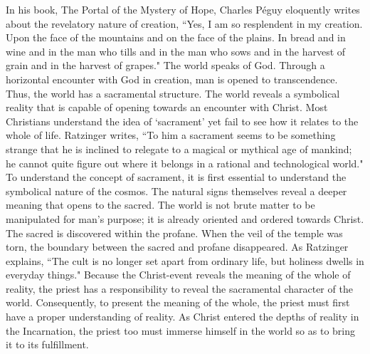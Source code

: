 \documentclass[twoside,10pt]{article}
\begin{document}
In his book, The Portal of the Mystery of Hope, Charles Péguy eloquently writes about the revelatory nature of creation, ``Yes, I am so resplendent in my creation. Upon the face of the mountains and on the face of the plains. In bread and in wine and in the man who tills and in the man who sows and in the harvest of grain and in the harvest of grapes."\autocite[4]{peguy} The world speaks of God. Through a horizontal encounter with God in creation, man is opened to transcendence. Thus, the world has a sacramental structure. The world reveals a symbolical reality that is capable of opening towards an encounter with Christ. Most Christians understand the idea of ‘sacrament’ yet fail to see how it relates to the whole of life. Ratzinger writes, ``To him a sacrament seems to be something strange that he is inclined to relegate to a magical or mythical age of mankind; he cannot quite figure out where it belongs in a rational and technological world."\autocite[169]{rat2} To understand the concept of sacrament, it is first essential to understand the symbolical nature of the cosmos. The natural signs themselves reveal a deeper meaning that opens to the sacred. The world is not brute matter to be manipulated for man’s purpose; it is already oriented and ordered towards Christ. The sacred is discovered within the profane. When the veil of the temple was torn, the boundary between the sacred and profane disappeared. As Ratzinger explains, ``The cult is no longer set apart from ordinary life, but holiness dwells in everyday things."\autocite[400]{rat2} Because the Christ-event reveals the meaning of the whole of reality, the priest has a responsibility to reveal the sacramental character of the world. Consequently, to present the meaning of the whole, the priest must first have a proper understanding of reality.\autocite[Cf.][Ratzinger links the crisis in the priesthood and the lack of vocations to a loss of understanding of reality. In modernity, the sacred is replaced by the functional and the world is seen simply as brute matter. This conception of the world alters the meaning of life. In order to understand the identity and mission of the priest, it is first essential to recover a more adequate understanding of the order and nature of the world so as to be able to recognize the priest’s role within that order.]{rat3} As Christ entered the depths of reality in the Incarnation, the priest too must immerse himself in the world so as to bring it to its fulfillment.\autocite[Cf.][John Chrysostom exemplifies this in his Baptismal Instructions. In order to explain the reality taking place, he draws analogies to real-world examples. In his Ninth Baptismal Instruction, he likens the renewal of nature in Baptism to a gold statue covered in dirt that must be melted down in order to be purified. He says that Christ does the same in baptism when ``He plunges it into the waters as into the smelting furnace and lets the grace of the Spirit fall on it instead of the flames." John Chrysostom uses this image to emphasize that Baptism is not just an exterior cleansing but a total renewal.]{chrysostom}
\end{document}
